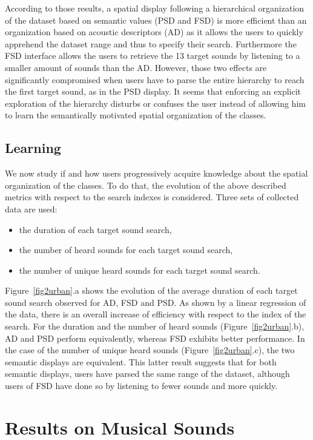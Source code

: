 \documentclass{aes2e}
\begin{document}
According to those results, a spatial display following a hierarchical organization of the dataset based on semantic values (PSD and FSD) is more efficient than an organization based on acoustic descriptors (AD) as it allows the users to quickly apprehend the dataset range and thus to specify their search. Furthermore the FSD interface allows the users to retrieve the 13 target sounds by listening to a smaller amount of sounds than the AD. However, those two effects are significantly compromised when users have to parse the entire hierarchy to reach the first target sound, as in the PSD display. It seems that enforcing an explicit exploration of the hierarchy disturbs or confuses the user instead of allowing him to learn the semantically motivated spatial organization of the classes. 


\subsection{Learning}

We now study if and how users progressively acquire knowledge about the spatial organization of the classes. To do that, the evolution of the above described metrics with respect to the search indexes is considered. Three sets of collected data are used:

\begin{itemize}
\item the duration of each target sound search,
\item the number of heard sounds for each target sound search,
\item the number of unique heard sounds for each target sound search. 
\end{itemize}

Figure~\ref{fig2urban}.a shows the evolution of the average duration of each target sound search observed for AD, FSD and PSD. As shown by a linear regression of the data, there is an overall increase of efficiency with respect to the index of the search. For the duration and the number of heard sounds (Figure~\ref{fig2urban}.b), AD and PSD perform equivalently, whereas FSD exhibits better performance. In the case of the number of unique heard sounds (Figure~\ref{fig2urban}.c), the two semantic displays are equivalent. This latter result suggests that for both semantic displays, users have parsed the same range of the dataset, although users of FSD have done so by listening to fewer sounds and more quickly. 

\section{Results on Musical Sounds} \label{resultsm}
\end{document}
